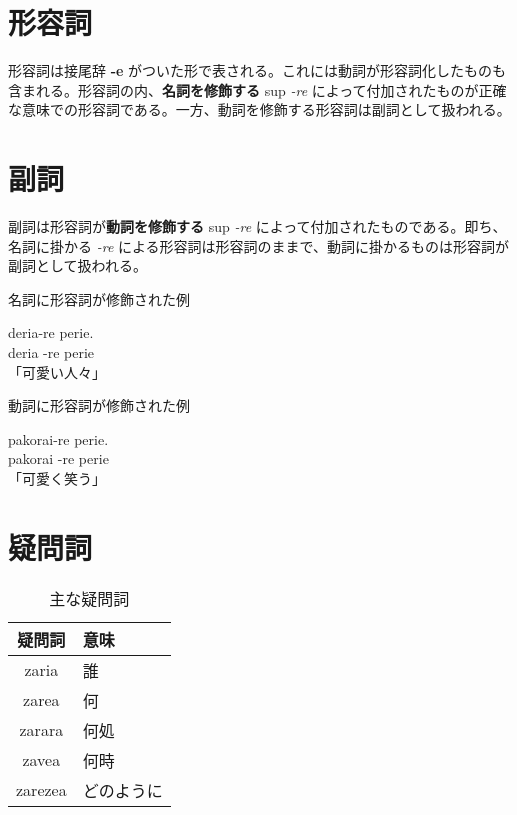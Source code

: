 \section{形容詞}

形容詞は接尾辞 \textbf{-e} がついた形で表される。これには動詞が形容詞化したものも含まれる。形容詞の内、\textbf{名詞を修飾する} sup \emph{-re} によって付加されたものが正確な意味での形容詞である。一方、動詞を修飾する形容詞は副詞として扱われる。

\section{副詞}

副詞は形容詞が\textbf{動詞を修飾する} sup \emph{-re} によって付加されたものである。即ち、名詞に掛かる \emph{-re} による形容詞は形容詞のままで、動詞に掛かるものは形容詞が副詞として扱われる。

\begin{itembox}[l]{名詞に形容詞が修飾された例}
    \begin{pindent}
        \noindent
        deria-re perie. \vspace{-1mm} \\
        deria -re perie \vspace{-1mm} \\
        「可愛い人々」
    \end{pindent}
\end{itembox}

\begin{itembox}[l]{動詞に形容詞が修飾された例}
    \begin{pindent}
        \noindent
        pakorai-re perie. \vspace{-1mm} \\
        pakorai -re perie \vspace{-1mm} \\
        「可愛く笑う」
    \end{pindent}
\end{itembox}

\section{疑問詞}

\begin{wraptable}[6]{r}{40mm}
    \centering
    \label{table:common-interrogatives}
    \caption{主な疑問詞}
    \begin{tabular}{cl}
        \toprule
        疑問詞 & 意味 \\
        \midrule
        zaria   & 誰 \\
        zarea   & 何 \\
        zarara  & 何処 \\
        zavea   & 何時 \\
        zarezea & どのように \\
        \bottomrule
    \end{tabular}
\end{wraptable}

